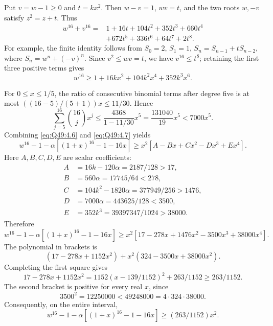 Put \(v=\allowbreak w-1\ge\allowbreak 0\) and \(t=\allowbreak kx^2\). Then \(w-v=\allowbreak 1\), \(wv=\allowbreak t\), and the two roots \(w,\allowbreak -v\) satisfy \(z^2=\allowbreak z+t\).
Thus
\[
\begin{aligned}
w^{16}+v^{16}
={}&1+16t+104t^2+352t^3+660t^4\\
&+672t^5+336t^6+64t^7+2t^8.
\end{aligned}
\tag{Q49.4.5}\label{eq:Q49:4.5}
\]
For example, the finite identity follows from
\(S_0=\allowbreak 2\), \(S_1=\allowbreak 1\), \(S_n=\allowbreak S_{n-1}+tS_{n-2}\), where
\(S_n=\allowbreak w^n+(-v)^n\).
Since \(v^2\le\allowbreak  wv=\allowbreak t\), we have \(v^{16}\le\allowbreak  t^8\); retaining the first three positive terms gives
\[
w^{16}\ge1+16kx^2+104k^2x^4+352k^3x^6.
\tag{Q49.4.6}\label{eq:Q49:4.6}
\]

For \(0\le\allowbreak  x\le\allowbreak 1/5\), the ratio of consecutive binomial terms after degree five is at most
\(((16-5)/(5+1))x\le\allowbreak 11/30\). Hence
\[
\sum_{j=5}^{16}\binom{16}{j}x^j
\le\frac{4368}{1-11/30}x^5
=\frac{131040}{19}x^5<7000x^5.
\tag{Q49.4.7}\label{eq:Q49:4.7}
\]
Combining \eqref{eq:Q49:4.6} and \eqref{eq:Q49:4.7} yields
\[
w^{16}-1-\alpha[(1+x)^{16}-1-16x]
\ge x^2[A-Bx+Cx^2-Dx^3+Ex^4].
\tag{Q49.4.8}\label{eq:Q49:4.8}
\]
Here \(A,\allowbreak B,\allowbreak C,\allowbreak D,\allowbreak E\) are scalar coefficients:
\[
\begin{aligned}
A&=16k-120\alpha=2187/128>17,\\
B&=560\alpha=17745/64<278,\\
C&=104k^2-1820\alpha=377949/256>1476,\\
D&=7000\alpha=443625/128<3500,\\
E&=352k^3=39397347/1024>38000.
\end{aligned}
\]
Therefore
\[
w^{16}-1-\alpha[(1+x)^{16}-1-16x]
\ge x^2[17-278x+1476x^2-3500x^3+38000x^4].
\tag{Q49.4.9}\label{eq:Q49:4.9}
\]
The polynomial in brackets is
\[
(17-278x+1152x^2)+x^2(324-3500x+38000x^2).
\]
Completing the first square gives
\[
17-278x+1152x^2
=1152(x-139/1152)^2+263/1152\ge263/1152.
\tag{Q49.4.10}\label{eq:Q49:4.10}
\]
The second bracket is positive for every real \(x\), since
\[
3500^2=12250000<49248000=4\cdot324\cdot38000.
\tag{Q49.4.11}\label{eq:Q49:4.11}
\]
Consequently, on the entire interval,
\[
w^{16}-1-\alpha[(1+x)^{16}-1-16x]\ge(263/1152)x^2.
\tag{Q49.4.12}\label{eq:Q49:4.12}
\]

